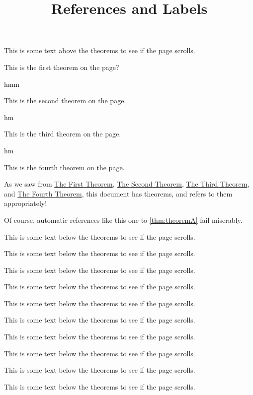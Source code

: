\documentclass{ximera}
\begin{document}
\title{References and Labels}

This is some text above the theorems to see if the page scrolls.

\begin{theorem}
\label{thm:theoremA} This is the first theorem on the page?
\end{theorem}

hmm

\begin{theorem}
\label{thm:theoremB} This is the second theorem on the page.
\end{theorem}

hm

\begin{theorem}
\label{thm:theoremC} This is the third theorem on the page.
\end{theorem}

hm


\begin{theorem}
\label{thm:theoremD} This is the fourth theorem on the page.
\end{theorem}

As we saw from \hyperref[thm:theoremA]{The First Theorem}, \hyperref[thm:theoremB]{The Second Theorem}, \hyperref[thm:theoremC]{The Third Theorem}, and \hyperref[thm:theoremD]{The Fourth Theorem}, this document has theorems, and refers to them appropriately!

Of course, automatic references like this one to \autoref{thm:theoremA} fail miserably.

This is some text below the theorems to see if the page scrolls.

This is some text below the theorems to see if the page scrolls.

This is some text below the theorems to see if the page scrolls.

This is some text below the theorems to see if the page scrolls.

This is some text below the theorems to see if the page scrolls.

This is some text below the theorems to see if the page scrolls.

This is some text below the theorems to see if the page scrolls.

This is some text below the theorems to see if the page scrolls.

This is some text below the theorems to see if the page scrolls.

This is some text below the theorems to see if the page scrolls.
\end{document}
